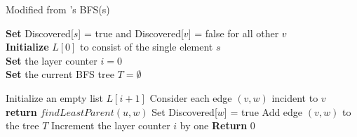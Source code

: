 \documentclass[paper=a4, fontsize=11pt]{scrartcl} %
\numberwithin{equation}{section} %
\numberwithin{figure}{section} %
\numberwithin{table}{section} %
\begin{document}
\begin{algorithm}
\caption{Modified from \cite{KT06}'s BFS(s)}
\textbf{Set} Discovered[$s$] = true and Discovered[$v$] = false for all other $v$
\\ \textbf{Initialize} $L[0]$ to consist of the single element $s$
\\ \textbf{Set} the layer counter $i = 0$
\\ \textbf{Set} the current BFS tree $T = \emptyset$
\begin{algorithmic}
	\STATE Initialize an empty list $L[i+1]$
	\STATE Consider each edge $(v, w)$ incident to $v$
			\STATE \textbf{return} $findLeastParent(u, w)$
			\STATE Set Discovered[$w$] = true
			\STATE Add edge $(v, w)$ to the tree $T$
		\ENDIF
	\ENDFOR
	\STATE Increment the layer counter $i$ by one
\ENDWHILE
\STATE \textbf{Return} 0
\end{algorithmic}
\end{algorithm}

\newpage
\end{document}
